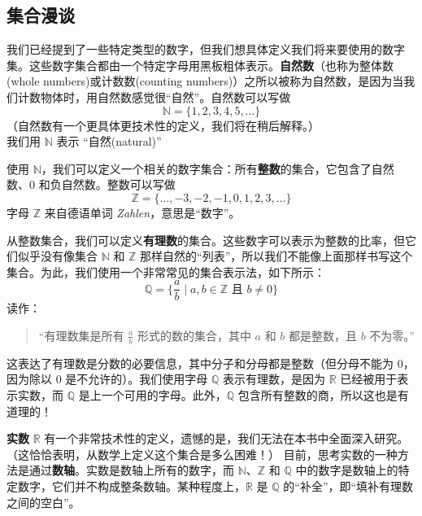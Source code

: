 \subsection{集合漫谈}

我们已经提到了一些特定类型的数字，但我们想具体定义我们将来要使用的数字集。这些数字集合都由一个特定字母用黑板粗体表示。\textbf{自然数}（也称为整体数(whole numbers)或计数数(counting numbers)）之所以被称为自然数，是因为当我们计数物体时，用自然数感觉很``自然''。自然数可以写做
\[\mathbb{N} = \{1, 2, 3, 4, 5, \dots\}\]
（自然数有一个更具体更技术性的定义，我们将在稍后解释。）\\
我们用 $\mathbb{N}$ 表示 ``自然(natural)''

使用 $\mathbb{N}$，我们可以定义一个相关的数字集合：所有\textbf{整数}的集合，它包含了自然数、$0$ 和负自然数。整数可以写做
\[\mathbb{Z} = \{\dots, -3, -2, -1, 0, 1, 2, 3, \dots\}\]
字母 $\mathbb{Z}$ 来自德语单词 \emph{Zahlen}，意思是``数字''。

从整数集合，我们可以定义\textbf{有理数}的集合。这些数字可以表示为整数的比率，但它们似乎没有像集合 $\mathbb{N}$ 和 $\mathbb{Z}$ 那样自然的``列表''，所以我们不能像上面那样书写这个集合。为此，我们使用一个非常常见的集合表示法，如下所示：
\[\mathbb{Q} = \Big\{\frac{a}{b} \mid a,b \in \mathbb{Z} \text{ 且 } b \ne 0\Big\}\]
读作：
\begin{quote}
    ``有理数集是所有 $\frac{a}{b}$ 形式的数的集合，其中 $a$ 和 $b$ 都是整数，且 $b$ 不为零。''
\end{quote}
这表达了有理数是分数的必要信息，其中分子和分母都是整数（但分母不能为 $0$，因为除以 $0$ 是不允许的）。我们使用字母 $\mathbb{Q}$ 表示有理数，是因为 $\mathbb{R}$ 已经被用于表示实数，而 $\mathbb{Q}$ 是上一个可用的字母。此外，$\mathbb{Q}$ 包含所有整数的商，所以这也是有道理的！

\textbf{实数} $\mathbb{R}$ 有一个非常技术性的定义，遗憾的是，我们无法在本书中全面深入研究。（这恰恰表明，从数学上定义这个集合是多么困难！） 目前，思考实数的一种方法是通过\textbf{数轴}。实数是数轴上所有的数字，而 $\mathbb{N}$、$\mathbb{Z}$ 和 $\mathbb{Q}$ 中的数字是数轴上的特定数字，它们并不构成整条数轴。某种程度上，$\mathbb{R}$ 是 $\mathbb{Q}$ 的``补全''，即``填补有理数之间的空白''。
